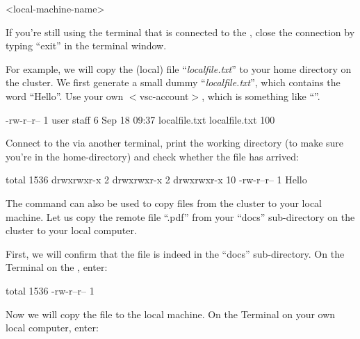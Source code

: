 \begin{prompt}
<local-machine-name>
\end{prompt}

  If you're still using the terminal that is connected to the \hpc, close the
  connection by typing ``exit'' in the terminal window.

  For example, we will copy the (local) file ``\emph{localfile.txt}'' to your
  home directory on the \hpc cluster. We first generate a small dummy
  ``\emph{localfile.txt}'', which contains the word ``Hello''.  Use your own
  $<$vsc-account$>$, which is something like ``\emph{\userid}''.

\begin{prompt}
-rw-r--r-- 1 user  staff   6 Sep 18 09:37 localfile.txt
localfile.txt    100%
\end{prompt}

  Connect to the \hpc via another terminal, print the working directory (to make
  sure you're in the home-directory) and check whether the file has arrived:

\begin{prompt}
total 1536
drwxrwxr-x  2 %
drwxrwxr-x  2 %
drwxrwxr-x 10 %
-rw-r--r--  1 %
Hello
\end{prompt}

  The  command can also be used to copy files from the cluster to your local machine.
  Let us copy the remote file ``\jobname.pdf'' from your ``docs''
  sub-directory on the cluster to your local computer.

  First, we will confirm that the file is indeed in the ``docs'' sub-directory.
  On the Terminal on the \hpc, enter:

\begin{prompt}
total 1536
-rw-r--r-- 1 %
\end{prompt}

  Now we will copy the file to the local machine. On the Terminal on your own local computer, enter:


